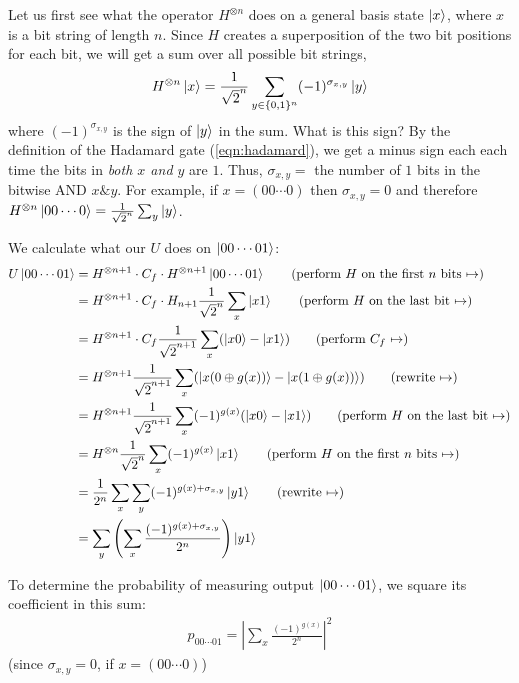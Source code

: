 \documentclass[a4paper, 11pt]{article}
\theoremstyle{definition}
\begin{document}
Let us first see what the operator $H^{\otimes n}$ does on a general basis state $\ket{x}$, where $x$ is a bit string of length $n$.
Since $H$ creates a superposition of the two bit positions for each bit, we will get a sum over all possible bit strings,
\begin{align*}
  H^{\otimes n} \ket{x} = \frac{1}{\sqrt{2}^n} \sum_{y \in \{0,1\}^n} (-1)^{\sigma_{x,y}} \ket{y}
\end{align*}
where $(-1)^{\sigma_{x,y}}$ is the sign of $\ket{y}$ in the sum.
What is this sign?
By the definition of the Hadamard gate (\ref{eqn:hadamard}), we get a minus sign each each time the bits in \emph{both $x$ and $y$} are $1$.
Thus, $\sigma_{x,y} =$ the number of $1$ bits in the bitwise AND $x \& y$.
For example, if $x = (00\cdots0)$ then $\sigma_{x,y} = 0$ and therefore $H^{\otimes n} \ket{00\cdots0} = \frac{1}{\sqrt{2}^n} \sum_y \ket{y}$.

\newcommand{\nexttag}[1]{\tag{#1 $\mapsto$}}

We calculate what our $U$ does on $\ket{00\cdots01}$:
\begin{align*}
  U\ket{00\cdots01} &= H^{\otimes n+1} \cdot C_f \cdot H^{\otimes n+1} \ket{00\cdots01} \nexttag{perform $H$ on the first $n$ bits}\\
  &= H^{\otimes n+1} \cdot C_f \cdot H_{n+1} \frac{1}{\sqrt{2}^n} \sum_x \ket{x1} \nexttag{perform $H$ on the last bit}\\
  &= H^{\otimes n+1} \cdot C_f \frac{1}{\sqrt{2}^{n+1}} \sum_x (\ket{x0} - \ket{x1}) \nexttag{perform $C_f$}\\
  &= H^{\otimes n+1} \frac{1}{\sqrt{2}^{n+1}} \sum_x (\ket{x(0 \oplus g(x))} - \ket{x(1 \oplus g(x))}) \nexttag{rewrite}\\
  &= H^{\otimes n+1} \frac{1}{\sqrt{2}^{n+1}} \sum_x (-1)^{g(x)}(\ket{x0} - \ket{x1}) \nexttag{perform $H$ on the last bit}\\
  &= H^{\otimes n} \frac{1}{\sqrt{2}^{n}} \sum_x (-1)^{g(x)}\ket{x1} \nexttag{perform $H$ on the first $n$ bits}\\
  &= \frac{1}{2^n} \sum_x \sum_y (-1)^{g(x)+\sigma_{x,y}}\ket{y1} \nexttag{rewrite}\\
  &= \sum_y \left(\sum_x \frac{(-1)^{g(x)+\sigma_{x,y}}}{2^n}\right)\ket{y1}
\end{align*}

To determine the probability of measuring output $\ket{00\cdots01}$, we square its coefficient in this sum:
\begin{align*}
  p_{00\cdots01} =\left|\sum_x \frac{(-1)^{g(x)}}{2^n}\right|^2
\end{align*}
(since $\sigma_{x,y} = 0$, if $x = (00\cdots0)$)
\end{document}
